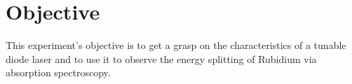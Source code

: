 \section{Objective}
\label{sec:versuchsziel}

This experiment's objective is to get a grasp on the characteristics of a tunable diode laser and to use it to observe the energy splitting of Rubidium via absorption spectroscopy.




